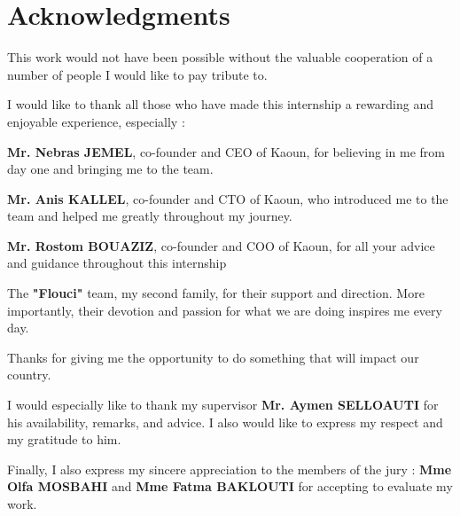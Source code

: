 \chapter*{Acknowledgments}

This work would not have been possible without the valuable cooperation of a number of people I would like to pay tribute to.\newline

I would like to thank all those who have made this internship a rewarding and enjoyable experience, especially :\newline

\textbf{Mr. Nebras JEMEL}, co-founder and CEO of Kaoun, for believing in me from day one and bringing me to the team.
\newline

 \textbf{Mr. Anis KALLEL}, co-founder and CTO of Kaoun, who introduced me to the team and helped me greatly throughout my journey.
 \newline
 
  \textbf{Mr. Rostom BOUAZIZ}, co-founder and COO of Kaoun, for all your advice and guidance throughout this internship 
  \newline
  
  The \textbf{"Flouci"} team, my second family, for their support and direction. More importantly, their devotion and passion for what we are doing inspires me every day.\newline

  \begin{center}
  	Thanks for giving me the opportunity to do something  that will impact our country.
  \end{center}
	



I would especially like to thank my supervisor \textbf{Mr. Aymen SELLOAUTI} for his availability, remarks, and advice. I also would like to express my respect and my gratitude to him.\newline

Finally, I also express my sincere appreciation to the members of the jury : \textbf{Mme Olfa MOSBAHI} and \textbf{Mme Fatma BAKLOUTI} for accepting to evaluate my work.

